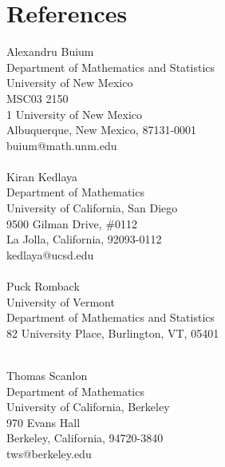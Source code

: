\documentclass[a4paper,10pt]{article}
\begin{document}
\section*{References}


\begin{multicols}{2}
	\begin{flushleft}
		Alexandru Buium\\
		Department of Mathematics and Statistics\\
		University of New Mexico\\
		MSC03 2150\\
		1 University of New Mexico\\
		Albuquerque, New Mexico, 87131-0001\\
		buium@math.unm.edu\\ \ \\
	
		Kiran Kedlaya\\
		Department of Mathematics\\
		University of California, San Diego\\
		9500 Gilman Drive, \#0112\\
		La Jolla, California, 92093-0112\\
		kedlaya@ucsd.edu \\ \ \\
		
		Puck Romback \\
		University of Vermont \\
		Department of Mathematics and Statistics \\
		82 University Place, Burlington, VT, 05401  \\ \ \\

\end{flushleft}

\begin{flushleft}
	Thomas Scanlon\\
Department of Mathematics\\
University of California, Berkeley\\
970 Evans Hall\\
Berkeley, California, 94720-3840\\
tws@berkeley.edu \\ \ \\



\end{flushleft}
\end{multicols}
\end{document}

